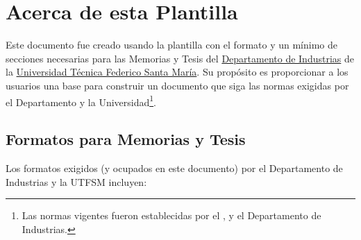 \chapter{Acerca de esta Plantilla}

Este documento fue creado usando la plantilla con el formato y un mínimo de secciones necesarias para las Memorias y Tesis del \href{http://www.industrias.usm.cl}{Departamento de Industrias} de la \href{http://www.usm.cl}{Universidad Técnica Federico Santa María}. Su propósito es proporcionar a los usuarios una base para construir un documento que siga las normas exigidas por el Departamento y la Universidad\footnote{Las normas vigentes fueron establecidas por el \cite{BibUTFSM2008}, y el Departamento de Industrias.}.

\section{Formatos para Memorias y Tesis}


Los formatos exigidos (y ocupados en este documento) por el Departamento de Industrias y la UTFSM incluyen:

